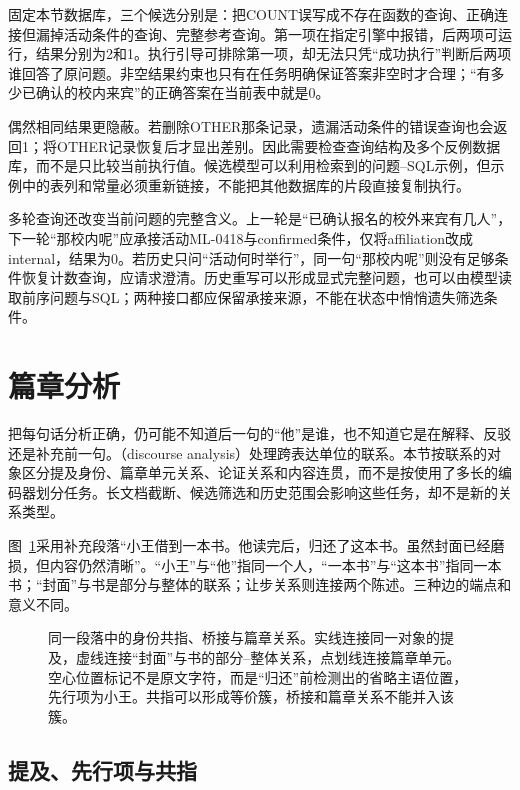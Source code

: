 固定本节数据库，三个候选分别是：把COUNT误写成不存在函数的查询、正确连接但漏掉活动条件的查询、完整参考查询。第一项在指定引擎中报错，后两项可运行，结果分别为2和1。执行引导可排除第一项，却无法只凭“成功执行”判断后两项谁回答了原问题。非空结果约束也只有在任务明确保证答案非空时才合理；“有多少已确认的校内来宾”的正确答案在当前表中就是0。

偶然相同结果更隐蔽。若删除OTHER那条记录，遗漏活动条件的错误查询也会返回1；将OTHER记录恢复后才显出差别。因此需要检查查询结构及多个反例数据库，而不是只比较当前执行值。候选模型可以利用检索到的问题--SQL示例，但示例中的表列和常量必须重新链接，不能把其他数据库的片段直接复制执行。

多轮查询还改变当前问题的完整含义。上一轮是“已确认报名的校外来宾有几人”，下一轮“那校内呢”应承接活动ML-0418与confirmed条件，仅将affiliation改成internal，结果为0。若历史只问“活动何时举行”，同一句“那校内呢”则没有足够条件恢复计数查询，应请求澄清。历史重写可以形成显式完整问题，也可以由模型读取前序问题与SQL；两种接口都应保留承接来源，不能在状态中悄悄遗失筛选条件。

\section{篇章分析}
\label{sec:nlp-analysis-discourse}

把每句话分析正确，仍可能不知道后一句的“他”是谁，也不知道它是在解释、反驳还是补充前一句。（discourse analysis）处理跨表达单位的联系。本节按联系的对象区分提及身份、篇章单元关系、论证关系和内容连贯，而不是按使用了多长的编码器划分任务。长文档截断、候选筛选和历史范围会影响这些任务，却不是新的关系类型。

图~\ref{fig:nlp-analysis-discourse}采用补充段落“小王借到一本书。他读完后，归还了这本书。虽然封面已经磨损，但内容仍然清晰”。“小王”与“他”指同一个人，“一本书”与“这本书”指同一本书；“封面”与书是部分与整体的联系；让步关系则连接两个陈述。三种边的端点和意义不同。

\begin{figure}[htbp]
  \centering
  
  \caption{同一段落中的身份共指、桥接与篇章关系。实线连接同一对象的提及，虚线连接“封面”与书的部分--整体关系，点划线连接篇章单元。空心位置标记不是原文字符，而是“归还”前检测出的省略主语位置，先行项为小王。共指可以形成等价簇，桥接和篇章关系不能并入该簇。}
  \label{fig:nlp-analysis-discourse}
\end{figure}
\FloatBarrier

\subsection{提及、先行项与共指}
\label{sec:nlp-analysis-coreference}


